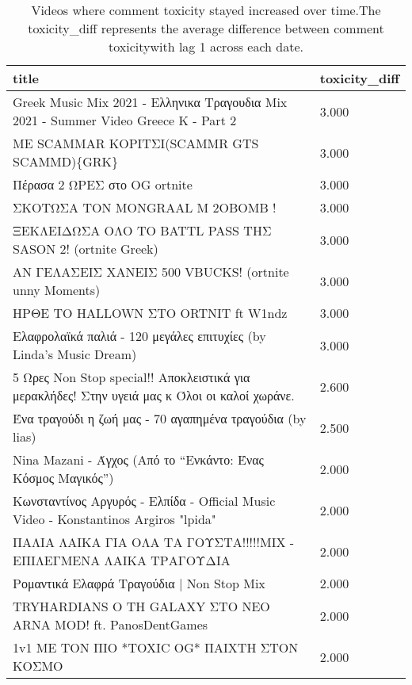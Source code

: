 \begin{table}
\caption{Videos where comment toxicity stayed increased over time.The toxicity\_diff represents the average difference between comment toxicitywith lag 1 across each date.}
\label{tab::toxic_increasing}
\begin{tabular}{|p{10cm}|p{1cm}|}
\toprule
title & toxicity\_diff \\
\midrule
Greek Music Mix 2021 - Ελληνικα Τραγουδια Mix 2021 - Summer Video Greece K - Part 2 & 3.000 \\
ΜΕ SCAMMAR ΚΟΡΙΤΣΙ(SCAMMR GTS SCAMMD)\{GRK\} & 3.000 \\
Πέρασα 2 ΩΡΕΣ στο OG ortnite & 3.000 \\
ΣΚΟΤΩΣΑ ΤΟΝ MONGRAAL M 2OBOMB ! & 3.000 \\
ΞΕΚΛΕΙΔΩΣΑ ΟΛΟ ΤΟ BATTL PASS ΤΗΣ SASON 2! (ortnite Greek) & 3.000 \\
ΑΝ ΓΕΛΑΣΕΙΣ ΧΑΝΕΙΣ 500 VBUCKS! (ortnite unny Moments) & 3.000 \\
ΗΡΘΕ ΤΟ HALLOWN ΣΤΟ ORTNIT ft W1ndz & 3.000 \\
Ελαφρολαϊκά παλιά - 120 μεγάλες επιτυχίες (by Linda's Music Dream) & 3.000 \\
 5 Ωρες Non Stop special!!  Αποκλειστικά για μερακλήδες!  Στην υγειά μας κ Όλοι οι καλοί χωράνε. & 2.600 \\
Ένα τραγούδι η ζωή μας - 70 αγαπημένα τραγούδια (by lias) & 2.500 \\
Nina Mazani - Άγχος (Από το “Ενκάντο: Ένας Κόσμος Μαγικός”) & 2.000 \\
Κωνσταντίνος Αργυρός - Ελπίδα - Official Music Video - Konstantinos Argiros "lpida" & 2.000 \\
ΠΑΛΙΑ ΛΑΙΚΑ ΓΙΑ ΟΛΑ ΤΑ ΓΟΥΣΤΑ!!!!!MIX - ΕΠΙΛΕΓΜΕΝΑ ΛΑΙΚΑ ΤΡΑΓΟΥΔΙΑ & 2.000 \\
Ρομαντικά Ελαφρά Τραγούδια | Non Stop Mix & 2.000 \\
TRYHARDIANS O TH GALAXY ΣΤΟ ΝΕΟ ARNA MOD! ft. PanosDentGames & 2.000 \\
1v1 ΜΕ ΤΟΝ ΠΙΟ *TOXIC OG* ΠΑΙΧΤΗ ΣΤΟΝ ΚΟΣΜΟ & 2.000 \\
\bottomrule
\end{tabular}
\end{table}
